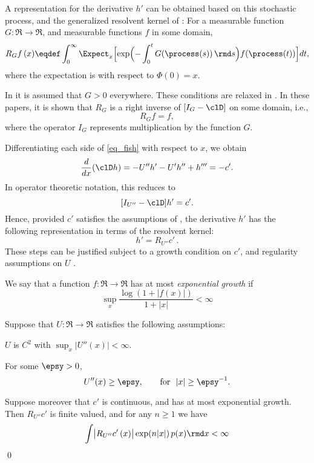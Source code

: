A representation for the derivative $h'$ can be obtained based on this stochastic process, and  the generalized resolvent kernel of \cite{nev72,meytwe93e,devkonmey16a}: For a measurable function $G\colon\Re\to\Re$, and measurable functions $f$ in some domain,
\begin{equation}
R_G f\, (x) \eqdef \int_0^\infty \Expect_x\Bigl[ \exp\Bigl(-\int_0^t G(\process(s))\, \rmd s \Bigr) f(\process(t))\Bigr] dt,
\label{e:Neveu}
\end{equation}
where the expectation is with respect to $\Phi(0)=x$.

In  \cite{nev72,meytwe93e} it is assumed that $G>0$ everywhere. These conditions are relaxed in \cite{konmey03a,devkonmey16a}. In these papers, it is shown that $R_G$ is a right inverse of $[I_G -\clD]$ on some domain, i.e.,
\begin{equation*}
[I_G-\clD]R_G f = f,
\end{equation*}
where the operator $I_G$ represents multiplication by the function $G$.

Differentiating each side of \eqref{eq_fish} with respect to $x$, we obtain
\[
\frac{d}{dx}  (\clD h) = -U'' h' - U' h '' +   h '''  =   - c'.
\]
In operator theoretic notation, this reduces to
\[
[I_{U''} -\clD] h' = c'.
\]
Hence, provided $c'$ satisfies the assumptions of \cite{devkonmey16b}, the derivative $h'$ has the following representation in terms of the resolvent kernel:
\begin{equation}
h' = R_{U''} c'\, .
\label{e:gradhrep}
\end{equation}
These steps can be justified subject to a growth condition on $c'$,  and  regularity assumptions on $U$  \cite{devkonmey16b}.

We say that a function $f\colon\Re\to\Re$ has at most \textit{exponential growth} if
\[
\sup_x  \frac{ \log(1+|f(x)|)}{1+|x|}  <\infty
\]

\begin{proposition}
	\label{t:grad_h_LE}
	Suppose that $U\colon\Re\to\Re$ satisfies the following assumptions:
	\begin{romannum}
		\item $U$ is $C^2$ with $\sup_x |U''(x)| <\infty$.
		\item  For some $\epsy>0$,
		\[
		U''(x) \ge \epsy,\qquad \text{for} \ \ |x|\ge \epsy^{-1}.
		\]
	\end{romannum}
	Suppose moreover that $c'$ is continuous, and has at most exponential growth.
	Then $ R_{U''} c'$ is finite valued, and for any $n\ge 1$ we have
	\[
	\int   \bigl|  R_{U''} c'\, (x) \bigr|\exp(n |x|)  \, p(x) \rmd x  <\infty
	\]
	\qed
\end{proposition}





